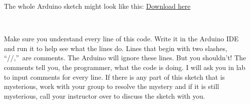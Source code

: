 The whole Arduino sketch might look like this:
\href{https://dtoliphant.github.io/PH250Manual/Code/DAQ_voltmeter.ino}{Download here}

% 
% 

\ 

Make sure you understand every line of this code. Write it in the Arduino
IDE and run it to help see what the lines do. Lines that begin with two
slashes, \textquotedblleft //,\textquotedblright\ are comments. The Arduino
will ignore these lines. But you shouldn't! The comments tell you, the
programmer, what the code is doing. I will ask you in lab to input comments
for every line. If there is any part of this sketch that is mysterious, work
with your group to resolve the mystery and if it is still mysterious, call
your instructor over to discuss the sketch with you.

